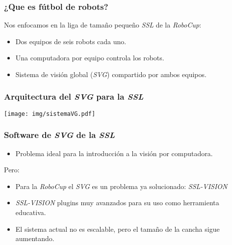 \documentclass[11pt,a4paper,spanish]{beamer}
\begin{document}
\begin{frame}

\frametitle{¿Que es fútbol de robots?}

	Nos enfocamos en la liga de tamaño pequeño \emph{SSL} de la
	\emph{RoboCup}:

\begin{itemize}

	\item Dos equipos de seis robots cada uno.

	\item Una computadora por equipo controla los robots.

	\item Sistema de visión global (\emph{SVG}) compartido por ambos
		equipos.

\end{itemize}

\end{frame}

\begin{frame}

\frametitle{Arquitectura del \emph{SVG} para la \emph{SSL}}

\texttt{[image: img/sistemaVG.pdf]}

\end{frame}

\begin{frame}

\frametitle{Software de \emph{SVG} de la \emph{SSL}}

\begin{itemize}

	\item Problema ideal para la introducción a la visión por computadora.

\end{itemize}

Pero:

\begin{itemize}

	\item Para la \emph{RoboCup} el \emph{SVG} es un problema ya
		solucionado: \emph{SSL-VISION}

	\item \emph{SSL-VISION} plugins muy avanzados para su uso como
		herramienta educativa.

	\item El sistema actual no es escalable, pero el tamaño de la cancha
		sigue aumentando.

\end{itemize}

\end{frame}
\end{document}
